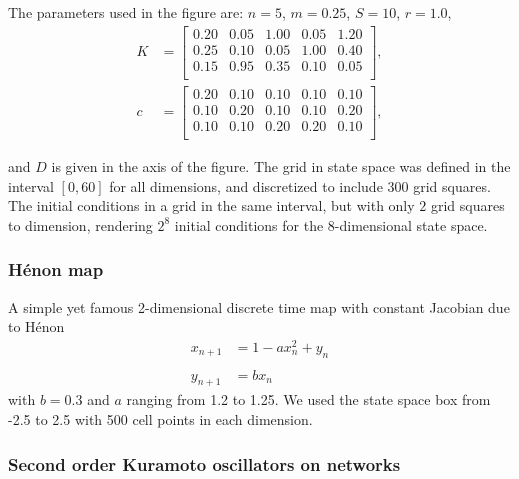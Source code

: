 \documentclass[%
 aip,
 amsmath,amssymb,
 reprint,%
]{revtex4-1}
\begin{document}
The parameters used in the figure are: $n = 5$, $m = 0.25$, $S = 10$, $r = 1.0$, 
\begin{align*}
        K &= \begin{bmatrix}
        0.20 & 0.05 & 1.00 & 0.05 & 1.20 \\
        0.25 & 0.10 & 0.05 & 1.00 & 0.40 \\ 
        0.15 & 0.95 & 0.35 & 0.10 & 0.05 \\
        \end{bmatrix}, \\
        c &= \begin{bmatrix}
        0.20 &0.10 &0.10 &0.10 &0.10\\
        0.10 &0.20 &0.10 &0.10 &0.20\\
        0.10 &0.10 &0.20 &0.20 &0.10 \\
    \end{bmatrix},
\end{align*}

and $D$ is given in the axis of the figure. The grid in state space was defined in the interval $[0, 60]$ for all dimensions, and discretized to include $300$ grid squares. The initial conditions in a grid in the same interval, but with only $2$ grid squares to dimension, rendering $2^8$ initial conditions for the $8$-dimensional state space. 


\subsubsection*{Hénon map}
A simple yet famous 2-dimensional discrete time map with constant Jacobian due to H\'enon
\begin{align*}
    x_{n+1} &= 1 - ax^2_n+y_n \\\\
    y_{n+1} & = bx_n
\end{align*}
with $b = 0.3$ and $a$ ranging from 1.2 to 1.25. We used the state space box from -2.5 to 2.5 with 500 cell points in each dimension.

\subsubsection*{Second order Kuramoto oscillators on networks}
\end{document}
